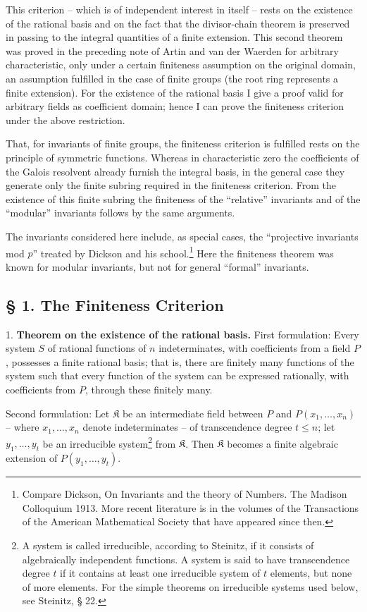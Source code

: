 \documentclass[11pt]{article}
\begin{document}
This criterion -- which is of independent interest in itself -- rests on the existence of the rational basis and on the fact that the divisor-chain theorem is preserved in passing to the integral quantities of a finite extension. This second theorem was proved in the preceding note of Artin and van der Waerden for arbitrary characteristic, only under a certain finiteness assumption on the original domain, an assumption fulfilled in the case of finite groups (the root ring represents a finite extension). For the existence of the rational basis I give a proof valid for arbitrary fields as coefficient domain; hence I can prove the finiteness criterion under the above restriction.

That, for invariants of finite groups, the finiteness criterion is fulfilled rests on the principle of symmetric functions. Whereas in characteristic zero the coefficients of the Galois resolvent already furnish the integral basis, in the general case they generate only the finite subring required in the finiteness criterion. From the existence of this finite subring the finiteness of the ``relative'' invariants and of the ``modular'' invariants follows by the same arguments.

The invariants considered here include, as special cases, the ``projective invariants mod $p$'' treated by Dickson and his school.\footnote{Compare Dickson, On Invariants and the theory of Numbers. The Madison Colloquium 1913. More recent literature is in the volumes of the Transactions of the American Mathematical Society that have appeared since then.} Here the finiteness theorem was known for modular invariants, but not for general ``formal'' invariants.

\subsection*{§ 1. The Finiteness Criterion}

1. \textbf{Theorem on the existence of the rational basis.} First formulation: Every system $S$ of rational functions of $n$ indeterminates, with coefficients from a field $P$, possesses a finite rational basis; that is, there are finitely many functions of the system such that every function of the system can be expressed rationally, with coefficients from $P$, through these finitely many.

Second formulation: Let $\mathfrak K$ be an intermediate field between $P$ and $P(x_1,\ldots,x_n)$ -- where $x_1,\ldots,x_n$ denote indeterminates -- of transcendence degree $t\leq n$; let $y_1,\ldots,y_t$ be an irreducible system\footnote{A system is called irreducible, according to Steinitz, if it consists of algebraically independent functions. A system is said to have transcendence degree $t$ if it contains at least one irreducible system of $t$ elements, but none of more elements. For the simple theorems on irreducible systems used below, see Steinitz, § 22.} from $\mathfrak K$. Then $\mathfrak K$ becomes a finite algebraic extension of $P(y_1,\ldots,y_t)$.
\end{document}
